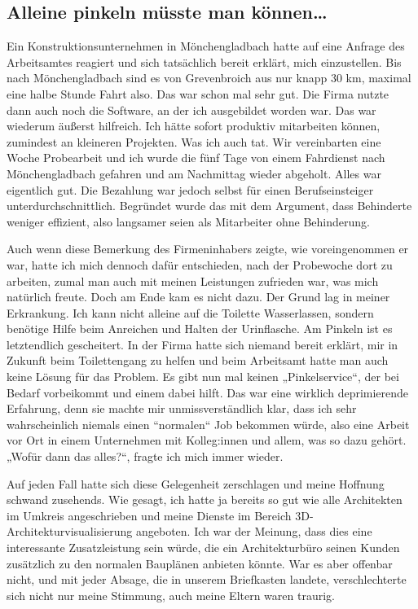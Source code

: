 \documentclass[fontsize=14pt,a4paper,headinclude,DIV=calc,automark]{scrbook}
\begin{document}
\subsection{Alleine pinkeln müsste man können…}

Ein Konstruktionsunternehmen in Mönchengladbach hatte auf eine Anfrage des Arbeitsamtes reagiert und sich tatsächlich bereit erklärt, mich einzustellen. Bis nach Mönchengladbach sind es von Grevenbroich aus nur knapp 30 km, maximal eine halbe Stunde Fahrt also. Das war schon mal sehr gut. Die Firma nutzte dann auch noch die Software, an der ich ausgebildet worden war. Das war wiederum äußerst hilfreich. Ich hätte sofort produktiv mitarbeiten können, zumindest an kleineren Projekten. Was ich auch tat. Wir vereinbarten eine Woche Probearbeit und ich wurde die fünf Tage von einem Fahrdienst nach Mönchengladbach gefahren und am Nachmittag wieder abgeholt. Alles war eigentlich gut. Die Bezahlung war jedoch selbst für einen Berufseinsteiger unterdurchschnittlich. Begründet wurde das mit dem Argument, dass Behinderte weniger effizient, also langsamer seien als Mitarbeiter ohne Behinderung.

Auch wenn diese Bemerkung des Firmeninhabers zeigte, wie voreingenommen er war, hatte ich mich dennoch dafür entschieden, nach der Probewoche dort zu arbeiten, zumal man auch mit meinen Leistungen zufrieden war, was mich natürlich freute. Doch am Ende kam es nicht dazu. Der Grund lag in meiner Erkrankung. Ich kann nicht alleine auf die Toilette Wasserlassen, sondern benötige Hilfe beim Anreichen und Halten der Urinflasche. Am Pinkeln ist es letztendlich gescheitert. In der Firma hatte sich niemand bereit erklärt, mir in Zukunft beim Toilettengang zu helfen und beim Arbeitsamt hatte man auch keine Lösung für das Problem. Es gibt nun mal keinen „Pinkelservice“, der bei Bedarf vorbeikommt und einem dabei hilft. Das war eine wirklich deprimierende Erfahrung, denn sie machte mir unmissverständlich klar, dass ich sehr wahrscheinlich niemals einen “normalen“ Job bekommen würde, also eine Arbeit vor Ort in einem Unternehmen mit Kolleg:innen und allem, was so dazu gehört. „Wofür dann das alles?“, fragte ich mich immer wieder.

Auf jeden Fall hatte sich diese Gelegenheit zerschlagen und meine Hoffnung schwand zusehends. Wie gesagt, ich hatte ja bereits so gut wie alle Architekten im Umkreis angeschrieben und meine Dienste im Bereich 3D-Architekturvisualisierung angeboten. Ich war der Meinung, dass dies eine interessante Zusatzleistung sein würde, die ein Architekturbüro seinen Kunden zusätzlich zu den normalen Bauplänen anbieten könnte. War es aber offenbar nicht, und mit jeder Absage, die in unserem Briefkasten landete, verschlechterte sich nicht nur meine Stimmung, auch meine Eltern waren traurig.
\end{document}
